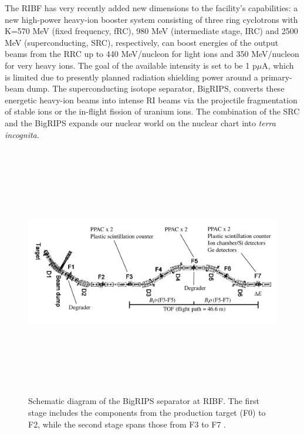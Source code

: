 The RIBF has very recently added new dimensions to the facility's capabilities: a new high-power heavy-ion booster system consisting of three ring cyclotrons with K=570 MeV (fixed frequency, fRC), 980 MeV (intermediate stage, IRC) and 2500 MeV (superconducting, SRC), respectively, can boost energies of the output beams from the RRC up to 440 MeV/nucleon for light ions and 350 MeV/nucleon for very heavy ions. The goal of the available intensity is set to be 1 p$\mu$A, which is limited due to presently planned radiation shielding power around a primary-beam dump. The superconducting isotope separator, BigRIPS, converts these energetic heavy-ion beams into intense RI beams via the projectile fragmentation of stable ions or the in-flight fission of uranium ions. The combination of the SRC and the BigRIPS expands our nuclear world on the nuclear chart into \textit{terra incognita}. 

\begin{figure}[h!]
\centering
\includegraphics[width=19cm, height=11cm, angle=90]{figures/bigrips.png}
\caption[Schematic diagram of the BigRIPS separator]{Schematic diagram of the BigRIPS separator at RIBF. The first stage includes the components from the production target (F0) to F2, while the second stage spans those from F3 to F7 \citep{FUKUDA2013323}.}
\end{figure}

